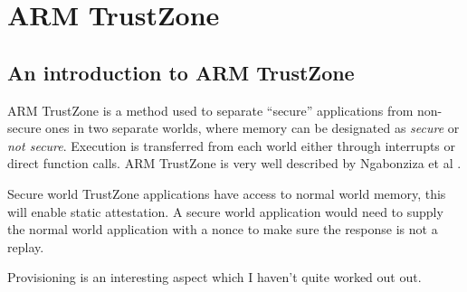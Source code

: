 \section{ARM TrustZone}

\subsection{An introduction to ARM TrustZone}

ARM TrustZone is a method used to separate “secure” applications from non-secure ones in two separate worlds, where memory can be designated as \textit{secure} or \textit{not secure}. Execution is transferred from each world either through interrupts or direct function calls. ARM TrustZone is very well described by Ngabonziza et al \cite{Ngabonziza2017}.

Secure world TrustZone applications have access to normal world memory, this will enable static attestation. A secure world application would need to supply the normal world application with a nonce to make sure the response is not a replay.

Provisioning is an interesting aspect which I haven’t quite worked out out.